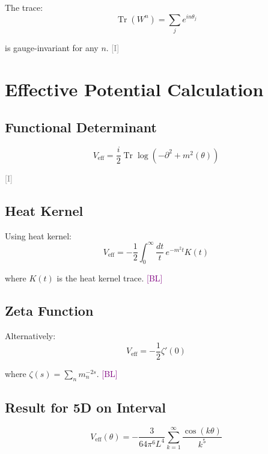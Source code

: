 \documentclass[11pt,a4paper]{article}
\newcommand{\tagI}{\textcolor{gray}{[I]}}
\newcommand{\tagBL}{\textcolor{purple}{[BL]}}
\DeclareMathOperator{\Tr}{Tr}
\begin{document}
The trace:
\begin{equation}
\label{eq:app-trace}
\Tr(W^n) = \sum_j e^{i n \theta_j}
\end{equation}

is gauge-invariant for any $n$. \tagI

\section{Effective Potential Calculation}
\label{app:veff}

\subsection{Functional Determinant}

\begin{equation}
\label{eq:app-det}
V_{\text{eff}} = \frac{i}{2} \Tr \log(-\partial^2 + m^2(\theta))
\end{equation}

\tagI

\subsection{Heat Kernel}

Using heat kernel:
\begin{equation}
\label{eq:app-heat}
V_{\text{eff}} = -\frac{1}{2} \int_0^\infty \frac{dt}{t} \, e^{-m^2 t} K(t)
\end{equation}

where $K(t)$ is the heat kernel trace. \tagBL

\subsection{Zeta Function}

Alternatively:
\begin{equation}
\label{eq:app-zeta}
V_{\text{eff}} = -\frac{1}{2} \zeta'(0)
\end{equation}

where $\zeta(s) = \sum_n m_n^{-2s}$. \tagBL

\subsection{Result for 5D on Interval}

\begin{equation}
\label{eq:app-result}
V_{\text{eff}}(\theta) = -\frac{3}{64\pi^6 L^4} \sum_{k=1}^\infty \frac{\cos(k\theta)}{k^5}
\end{equation}
\end{document}
